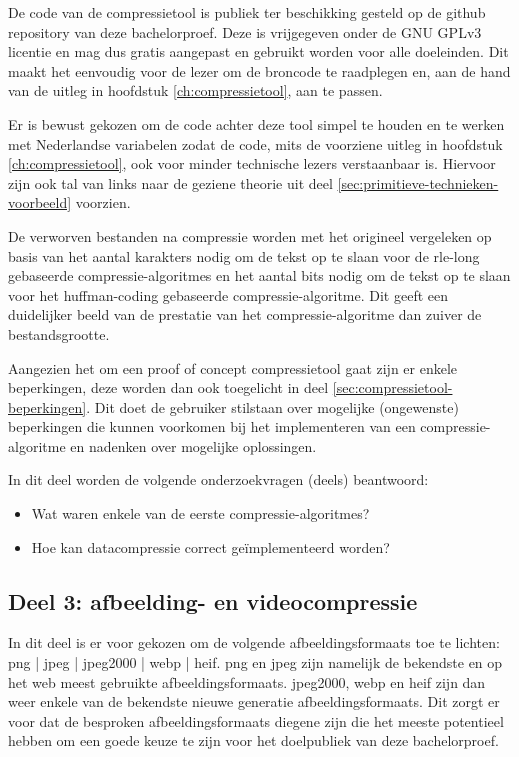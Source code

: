 De code van de \gls{compressietool} is publiek ter beschikking gesteld op de \gls{github} repository van deze bachelorproef. Deze is vrijgegeven onder de GNU GPLv3 licentie en mag dus gratis aangepast en gebruikt worden voor alle doeleinden. Dit maakt het eenvoudig voor de lezer om de broncode te raadplegen en, aan de hand van de uitleg in hoofdstuk \ref{ch:compressietool}, aan te passen.

Er is bewust gekozen om de code achter deze tool simpel te houden en te werken met Nederlandse variabelen zodat de code, mits de voorziene uitleg in hoofdstuk \ref{ch:compressietool}, ook voor minder technische lezers verstaanbaar is. Hiervoor zijn ook tal van links naar de geziene theorie uit deel \ref{sec:primitieve-technieken-voorbeeld} voorzien.

De verworven bestanden na compressie worden met het origineel vergeleken op basis van het aantal karakters nodig om de tekst op te slaan voor de \gls{rle-long} gebaseerde \glspl{compressie-algoritme} en het aantal bits nodig om de tekst op te slaan voor het \gls{huffman-coding} gebaseerde \gls{compressie-algoritme}. Dit geeft een duidelijker beeld van de prestatie van het \gls{compressie-algoritme} dan zuiver de bestandsgrootte.

Aangezien het om een proof of concept \gls{compressietool} gaat zijn er enkele beperkingen, deze worden dan ook toegelicht in deel \ref{sec:compressietool-beperkingen}. Dit doet de gebruiker stilstaan over mogelijke (ongewenste) beperkingen die kunnen voorkomen bij het implementeren van een \gls{compressie-algoritme} en nadenken over mogelijke oplossingen.

In dit deel worden de volgende onderzoekvragen (deels) beantwoord: 
\begin{itemize}
	\item Wat waren enkele van de eerste \glspl{compressie-algoritme}?
	\item Hoe kan \gls{datacompressie} correct geïmplementeerd worden?
\end{itemize}

\subsection{Deel 3: afbeelding- en videocompressie}
\label{sec:aanpak-bachelorproef-deel-3}

In dit deel is er voor gekozen om de volgende \glspl{afbeeldingsformaat} toe te lichten: \gls{png} | \gls{jpeg} | \gls{jpeg2000} | \gls{webp} | \gls{heif}. \Gls{png} en \gls{jpeg} zijn namelijk de bekendste en op het web meest gebruikte \glspl{afbeeldingsformaat}. \Gls{jpeg2000}, \gls{webp} en \gls{heif} zijn dan weer enkele van de bekendste nieuwe generatie \glspl{afbeeldingsformaat}. Dit zorgt er voor dat de besproken \glspl{afbeeldingsformaat} diegene zijn die het meeste potentieel hebben om een goede keuze te zijn voor het doelpubliek van deze bachelorproef.

